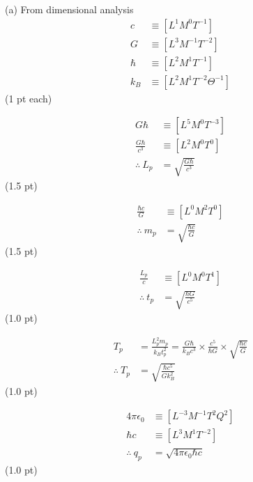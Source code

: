 (a) From dimensional analysis
\begin{align*}
  c &\equiv \left[L^1 M^0 T^{-1}\right]\\
  G &\equiv \left[L^3 M^{-1} T^{-2}\right]\\
  \hbar &\equiv \left[L^2 M^1 T^{-1}\right]\\
  k_B &\equiv \left[L^2 M^1 T^{-2} \Theta^{-1}\right]
\end{align*}
\hfill(1 pt each)

\begin{align*}
  G\hbar &\equiv \left[L^5 M^0 T^{-3}\right]\\
  \frac{G\hbar}{c^3} &\equiv \left[L^2 M^0 T^0\right]\\
  \therefore\ L_p &= \sqrt{\frac{G\hbar}{c^3}}
\end{align*}
\hfill(1.5 pt)

\begin{align*}
  \frac{\hbar c}{G} &\equiv \left[L^0 M^2 T^0\right]\\
  \therefore\ m_p &= \sqrt{\frac{\hbar c}{G}}
\end{align*}
\hfill(1.5 pt)

\begin{align*}
  \frac{L_p}{c} &\equiv \left[L^0 M^0 T^1\right]\\
  \therefore\ t_p &= \sqrt{\frac{\hbar G}{c^5}}
\end{align*}
\hfill(1.0 pt)

\begin{align*}
  T_p &= \frac{L_p^2 m_p}{k_B t_p^2}
       = \frac{G\hbar}{k_B c^3} \times \frac{c^5}{\hbar G}
         \times \sqrt{\frac{\hbar c}{G}}\\
  \therefore\ T_p &= \sqrt{\frac{\hbar c^5}{G k_B^2}}
\end{align*}
\hfill(1.0 pt)

\begin{align*}
  4\pi\epsilon_0 &\equiv \left[L^{-3} M^{-1} T^2 Q^2\right]\\
  \hbar c &\equiv \left[L^3 M^1 T^{-2}\right]\\
  \therefore\ q_p &= \sqrt{4\pi\epsilon_0 \hbar c}
\end{align*}
\hfill(1.0 pt)
